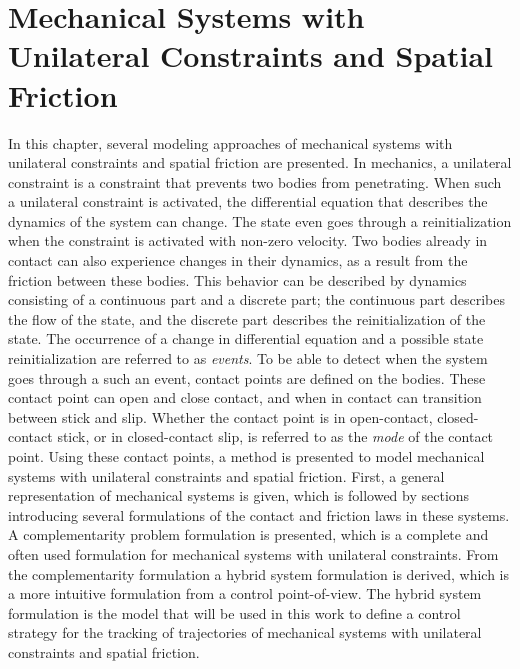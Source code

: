 \documentclass[../DC2017114Bouma.tex]{subfiles}
\begin{document}
\graphicspath{{02_Material/img/}}
\renewcommand{\chaptermark}[1]{\markboth{\thechapter.\ #1}{}}
\renewcommand{\sectionmark}[1]{\markright{#1}{}}
\pagestyle{fancyreport}
\cleartooddpage
\pagestyle{fancyreport}
\chapter{Mechanical Systems with Unilateral Constraints and Spatial Friction}\label{ch:model}
In this chapter, several modeling approaches of mechanical systems with unilateral constraints and spatial friction are presented. In mechanics, a unilateral constraint is a constraint that prevents two bodies from penetrating. When such a unilateral constraint is activated, the differential equation that describes the dynamics of the system can change. The state even goes through a reinitialization when the constraint is activated with non-zero velocity. Two bodies already in contact can also experience changes in their dynamics, as a result from the friction between these bodies. This behavior can be described by dynamics consisting of a continuous part and a discrete part; the continuous part describes the flow of the state, and the discrete part describes the reinitialization of the state. The occurrence of a change in differential equation and a possible state reinitialization are referred to as \textit{events}. To be able to detect when the system goes through a such an event, contact points are defined on the bodies. These contact point can open and close contact, and when in contact can transition between stick and slip. Whether the contact point is in open-contact, closed-contact stick, or in closed-contact slip, is referred to as the \textit{mode} of the contact point. Using these contact points, a method is presented to model mechanical systems with unilateral constraints and spatial friction. First, a general representation of mechanical systems is given, which is followed by sections introducing several formulations of the contact and friction laws in these systems. A complementarity problem formulation is presented, which is a complete and often used formulation for mechanical systems with unilateral constraints. From the complementarity formulation a hybrid system formulation is derived, which is a more intuitive formulation from a control point-of-view. The hybrid system formulation is the model that will be used in this work to define a control strategy for the tracking of trajectories of mechanical systems with unilateral constraints and spatial friction.
\end{document}

